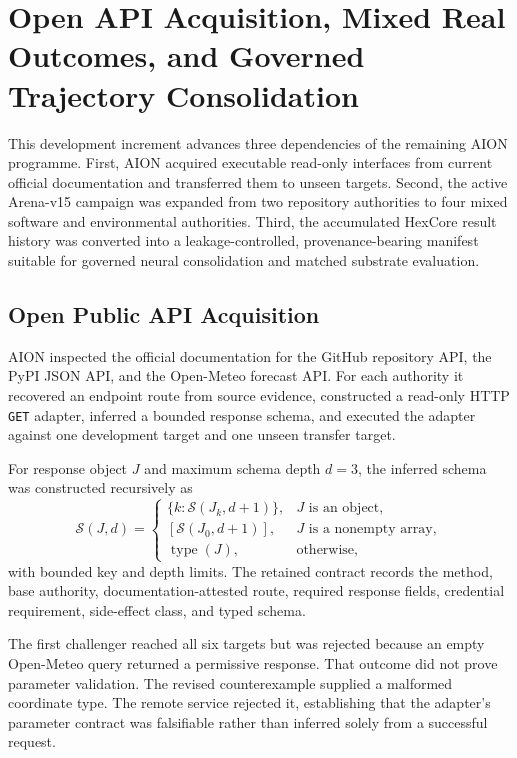 \section{Open API Acquisition, Mixed Real Outcomes, and Governed Trajectory Consolidation}
\label{sec:open-api-duration-consolidation}

This development increment advances three dependencies of the remaining AION
programme.  First, AION acquired executable read-only interfaces from current
official documentation and transferred them to unseen targets.  Second, the
active Arena-v15 campaign was expanded from two repository authorities to four
mixed software and environmental authorities.  Third, the accumulated HexCore
result history was converted into a leakage-controlled, provenance-bearing
manifest suitable for governed neural consolidation and matched substrate
evaluation.

\subsection{Open Public API Acquisition}
\label{subsec:open-public-api-acquisition}

AION inspected the official documentation for the GitHub repository API, the
PyPI JSON API, and the Open-Meteo forecast API.  For each authority it recovered
an endpoint route from source evidence, constructed a read-only HTTP
\texttt{GET} adapter, inferred a bounded response schema, and executed the
adapter against one development target and one unseen transfer target.

For response object $J$ and maximum schema depth $d=3$, the inferred schema was
constructed recursively as
\begin{equation}
 \mathcal{S}(J,d)=
 \begin{cases}
  \{k:\mathcal{S}(J_k,d+1)\}, & J\text{ is an object},\\
  [\mathcal{S}(J_0,d+1)], & J\text{ is a nonempty array},\\
  \operatorname{type}(J), & \text{otherwise},
 \end{cases}
\end{equation}
with bounded key and depth limits.  The retained contract records the method,
base authority, documentation-attested route, required response fields,
credential requirement, side-effect class, and typed schema.

The first challenger reached all six targets but was rejected because an empty
Open-Meteo query returned a permissive response.  That outcome did not prove
parameter validation.  The revised counterexample supplied a malformed
coordinate type.  The remote service rejected it, establishing that the
adapter's parameter contract was falsifiable rather than inferred solely from
a successful request.

